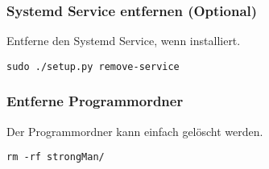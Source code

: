\subsubsection{Systemd Service entfernen (Optional)}
Entferne den Systemd Service, wenn installiert.
\begin{lstlisting}[style=BashInputStyle]
    sudo ./setup.py remove-service
\end{lstlisting}

\subsubsection{Entferne Programmordner}
Der Programmordner kann einfach gelöscht werden.
\begin{lstlisting}[style=BashInputStyle]
    rm -rf strongMan/
\end{lstlisting}

